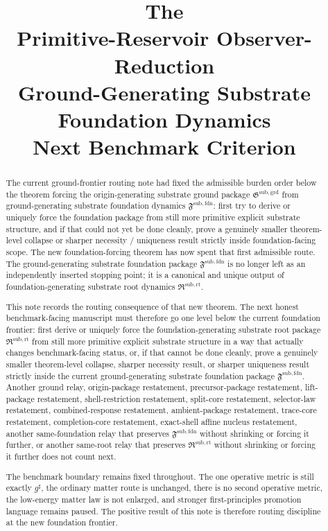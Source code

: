 \documentclass[11pt]{article}
\title{\textbf{The \TheoryName{}}\\[0.4em]
\large Primitive-Reservoir Observer-Reduction\\
\large Ground-Generating Substrate Foundation Dynamics\\
\large Next Benchmark Criterion}
\author{}
\date{}
\newcommand{\CompletedMetric}{g^{\sharp}}
\newcommand{\GroundPackage}{\mathfrak G^{\mathrm{sub,grd}}}
\newcommand{\FoundationPackage}{\mathfrak F^{\mathrm{sub,fdn}}}
\newcommand{\RootPackage}{\mathfrak R^{\mathrm{sub,rt}}}
\begin{document}
\maketitle

\begin{abstract}
The current ground-frontier routing note had fixed the admissible burden order below the theorem forcing the origin-generating substrate ground package \(\GroundPackage\) from ground-generating substrate foundation dynamics \(\FoundationPackage\): first try to derive or uniquely force the foundation package from still more primitive explicit substrate structure, and if that could not yet be done cleanly, prove a genuinely smaller theorem-level collapse or sharper necessity / uniqueness result strictly inside foundation-facing scope. The new foundation-forcing theorem has now spent that first admissible route. The ground-generating substrate foundation package \(\FoundationPackage\) is no longer left as an independently inserted stopping point; it is a canonical and unique output of foundation-generating substrate root dynamics \(\RootPackage\).

This note records the routing consequence of that new theorem. The next honest benchmark-facing manuscript must therefore go one level below the current foundation frontier: first derive or uniquely force the foundation-generating substrate root package \(\RootPackage\) from still more primitive explicit substrate structure in a way that actually changes benchmark-facing status, or, if that cannot be done cleanly, prove a genuinely smaller theorem-level collapse, sharper necessity result, or sharper uniqueness result strictly inside the current ground-generating substrate foundation package \(\FoundationPackage\). Another ground relay, origin-package restatement, precursor-package restatement, lift-package restatement, shell-restriction restatement, split-core restatement, selector-law restatement, combined-response restatement, ambient-package restatement, trace-core restatement, completion-core restatement, exact-shell affine nucleus restatement, another same-foundation relay that preserves \(\FoundationPackage\) without shrinking or forcing it further, or another same-root relay that preserves \(\RootPackage\) without shrinking or forcing it further does not count next.

The benchmark boundary remains fixed throughout. The one operative metric is still exactly \(\CompletedMetric\), the ordinary matter route is unchanged, there is no second operative metric, the low-energy matter law is not enlarged, and stronger first-principles promotion language remains paused. The positive result of this note is therefore routing discipline at the new foundation frontier.
\end{abstract}
\end{document}
